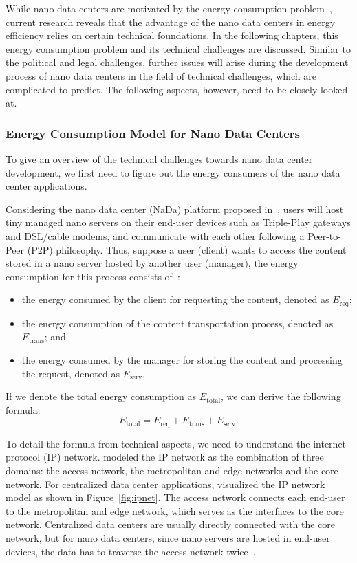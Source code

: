 While nano data centers are motivated by the energy consumption problem~\cite{DBLP:conf/conext/ValanciusLMDR09},
current research reveals that the advantage of the nano data centers in energy efficiency relies on certain technical foundations.
In the following chapters, this energy consumption problem and its technical challenges are discussed. Similar to the political and legal challenges, further issues will arise during the development process of nano data centers in the field of technical challenges, which are complicated to predict. The following aspects, however, need to be closely looked at. 


\subsubsection{Energy Consumption Model for Nano Data Centers} \label{sec:model}


To give an overview of the technical challenges towards nano data center development,
we first need to figure out the energy consumers of the nano data center applications.

Considering the nano data center (NaDa) platform proposed in~\cite{DBLP:conf/conext/ValanciusLMDR09},
users will host tiny managed nano servers on their end-user devices such as Triple-Play gateways and DSL/cable modems,
and communicate with each other following a Peer-to-Peer (P2P) philosophy.
Thus, suppose a user (client) wants to access the content stored in a nano server hosted by another user (manager),
the energy consumption for this process consists of~\cite{DBLP:journals/sigmetrics/JalaliAVHAT14}:
\begin{itemize}
\item the energy consumed by the client for requesting the content, denoted as $E_\text{req}$;
\item the energy consumption of the content transportation process, denoted as $E_\text{trans}$; and
\item the energy consumed by the manager for storing the content and processing the request, denoted as $E_\text{serv}$.
\end{itemize}
If we denote the total energy consumption as $E_\text{total}$, we can derive the following formula:
\begin{equation}
E_\text{total}=E_\text{req}+E_\text{trans}+E_\text{serv} \label{abstract_model}.
\end{equation}

To detail the formula from technical aspects, we need to understand the internet protocol (IP) network.
\cite{iptv} modeled the IP network as the combination of three domains:
the access network, the metropolitan and edge networks and the core network.
For centralized data center applications,
\cite{iptv} visualized the IP network model as shown in Figure~\ref{fig:ipnet}.
The access network connects each end-user to the metropolitan and edge network,
which serves as the interfaces to the core network.
Centralized data centers are usually directly connected with the core network,
but for nano data centers, since nano servers are hosted in end-user devices,
the data has to traverse the access network twice~\cite{tradeoff}.
 
